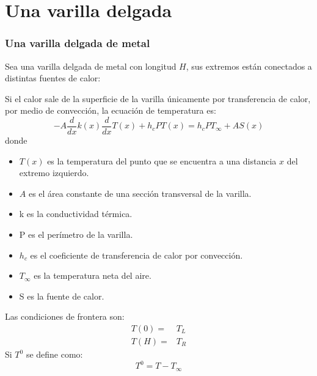 \section{Una varilla delgada}
\begin{frame}
\frametitle{Una varilla delgada de metal}
Sea una varilla delgada de metal con longitud $H$, sus extremos est\'{a}n conectados a distintas fuentes de calor:
\begin{center}
\end{center}
\end{frame}
\begin{frame}
\fontsize{12}{12}\selectfont
Si el calor sale de la superficie de la varilla \'{u}nicamente por transferencia de calor, por medio de convecci\'{o}n, la ecuaci\'{o}n de temperatura es:
\[ -A \dfrac{d}{dx} k(x) \dfrac{d}{dx} T(x) + h_{c} PT(x) = h_{c} PT_{\infty} + AS(x)\]
donde
\begin{itemize}
\item $T(x)$ es la temperatura del punto que se encuentra a una distancia $x$ del extremo izquierdo.
\item $A$ es el \'{a}rea constante de una secci\'{o}n transversal de la varilla.
\item k es la conductividad t\'{e}rmica.
\item P es el per\'{i}metro de la varilla.
\item $h_{c}$ es el coeficiente de transferencia de calor por convecci\'{o}n.
\item $T_{\infty}$ es la temperatura neta del aire.
\item S es la fuente de calor.
\end{itemize}
\end{frame}
\begin{frame}
Las condiciones de frontera son:
\[ \begin{split} T(0) =& T_{L} \\
T(H) =& T_{R}
\end{split} \]
Si $T^{0}$ se define como:
\[ T^{0} = T - T_{\infty} \]
\end{frame}
